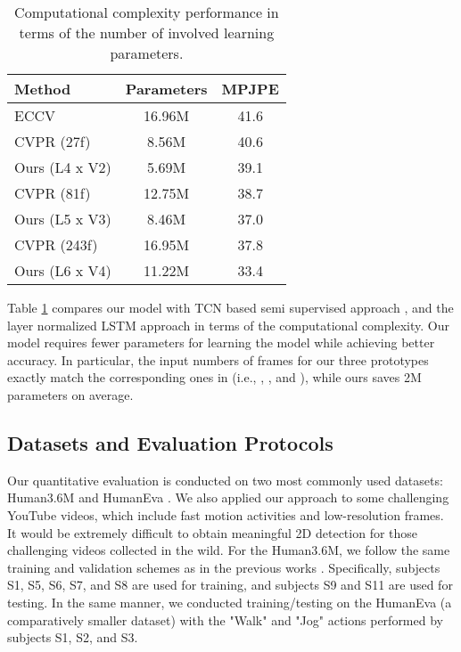 \documentclass[twocolumn]{svjour3}          \smartqed  \usepackage{graphicx}
\begin{document}
\begin{table}[ht]
	\begin{center}

			\begin{tabular}{l|c c}
				\toprule
				 Method & Parameters & MPJPE\\
				\midrule
ECCV
				\citep{Hossain2018} &16.96M & 41.6\\
CVPR
				\citep{Pavllo2019} (27f) & 8.56M & 40.6\\
				Ours (L4 x V2) & 5.69M & 39.1 \\
				\midrule
CVPR
				\citep{Pavllo2019} (81f) & 12.75M & 38.7\\
				Ours (L5 x V3) & 8.46M & 37.0\\
			    \midrule
CVPR
			    \citep{Pavllo2019} (243f) & 16.95M & 37.8\\
			    Ours (L6 x V4) & 11.22M & 33.4\\
				\bottomrule
			\end{tabular}
	\end{center}
	\caption{Computational complexity performance in terms of the number of involved learning parameters. }
	\label{tb:tb5}
\end{table}

Table \ref{tb:tb5} compares our model with TCN based  semi supervised approach \citep{Pavllo2019}, and the layer normalized LSTM approach \citep{Hossain2018} in terms of the computational complexity. Our model requires fewer parameters for learning the model while achieving better accuracy.  In particular, the input numbers of frames for our three prototypes exactly match the corresponding ones in \citep{Pavllo2019} (i.e., , , and ), while ours saves 2M parameters on average. 

\subsection{Datasets and Evaluation Protocols}
Our quantitative evaluation is conducted on two most commonly used datasets: Human3.6M \citep{Ionescu2014} and HumanEva \citep{Sigal2010}. We also applied our approach to some challenging YouTube videos, which include fast motion activities and low-resolution frames. It would be extremely difficult to obtain meaningful 2D detection for those challenging videos collected in the wild. For the Human3.6M, we follow the same training and validation schemes as in the previous works \citep{Martinez2017, Yang2018, Hossain2018, Pavllo2019}. Specifically, subjects S1, S5, S6, S7, and S8 are used for training, and subjects S9 and S11 are used for testing. In the same manner, we conducted training/testing on the HumanEva (a comparatively smaller dataset) with the "Walk" and "Jog" actions performed by subjects S1, S2, and S3.
\end{document}
